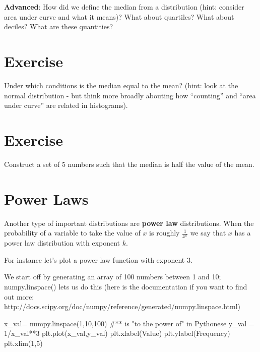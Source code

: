 \documentclass[
  letterpaper,
  DIV=11,
  numbers=noendperiod]{scrreprt}
\newenvironment{Shaded}{\begin{snugshade}}{\end{snugshade}}
\newcommand{\CommentTok}[1]{\textcolor[rgb]{0.37,0.37,0.37}{#1}}
\newcommand{\DecValTok}[1]{\textcolor[rgb]{0.68,0.00,0.00}{#1}}
\newcommand{\NormalTok}[1]{\textcolor[rgb]{0.00,0.23,0.31}{#1}}
\newcommand{\OperatorTok}[1]{\textcolor[rgb]{0.37,0.37,0.37}{#1}}
\newcommand{\StringTok}[1]{\textcolor[rgb]{0.13,0.47,0.30}{#1}}
\begin{document}
\textbf{Advanced}: How did we define the median from a distribution
(hint: consider area under curve and what it means)? What about
quartiles? What about deciles? What are these quantities?

\hypertarget{exercise-18}{%
\section{Exercise}\label{exercise-18}}

Under which conditions is the median equal to the mean? (hint: look at
the normal distribution - but think more broadly abouting how
``counting'' and ``area under curve'' are related in histograms).

\hypertarget{exercise-19}{%
\section{Exercise}\label{exercise-19}}

Construct a set of 5 numbers such that the median is half the value of
the mean.

\hypertarget{power-laws}{%
\section{Power Laws}\label{power-laws}}

Another type of important distributions are \textbf{power law}
distributions. When the probability of a variable to take the value of
\(x\) is roughly \(\frac{1}{x^k}\) we say that \(x\) has a power law
distribution with exponent \(k\).

For instance let's plot a power law function with exponent 3.

We start off by generating an array of 100 numbers between 1 and 10;
numpy.linspace() lets us do this (here is the documentation if you want
to find out more:
http://docs.scipy.org/doc/numpy/reference/generated/numpy.linspace.html)

\begin{Shaded}
\begin{Highlighting}[]
\NormalTok{x\_val}\OperatorTok{=}\NormalTok{ numpy.linspace(}\DecValTok{1}\NormalTok{,}\DecValTok{10}\NormalTok{,}\DecValTok{100}\NormalTok{)}
\CommentTok{\#** is "to the power of" in Pythonese}
\NormalTok{y\_val }\OperatorTok{=} \DecValTok{1}\OperatorTok{/}\NormalTok{x\_val}\OperatorTok{**}\DecValTok{3}
\NormalTok{plt.plot(x\_val,y\_val)}
\NormalTok{plt.xlabel(}\StringTok{\textquotesingle{}Value\textquotesingle{}}\NormalTok{)}
\NormalTok{plt.ylabel(}\StringTok{\textquotesingle{}Frequency\textquotesingle{}}\NormalTok{)}
\NormalTok{plt.xlim(}\DecValTok{1}\NormalTok{,}\DecValTok{5}\NormalTok{)}
\end{Highlighting}
\end{Shaded}
\end{document}
